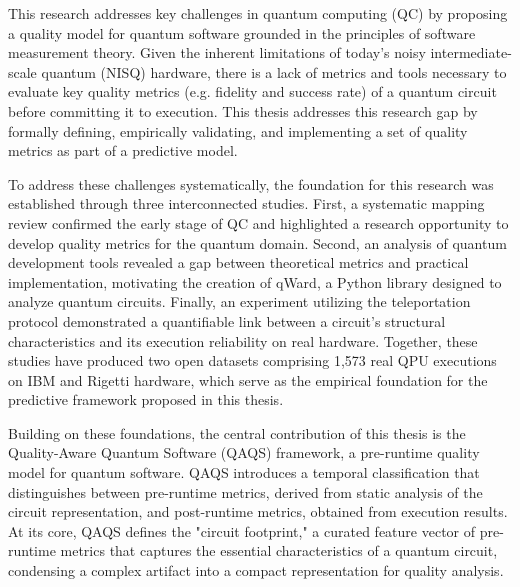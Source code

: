\documentclass{article}
\begin{document}
This research addresses key challenges in quantum computing (QC) by proposing a quality model for quantum software grounded in the principles of software measurement theory. Given the inherent limitations of today's noisy intermediate-scale quantum (NISQ) hardware, there is a lack of metrics and tools necessary to evaluate key quality metrics (e.g. fidelity and success rate) of a quantum circuit before committing it to execution. This thesis addresses this research gap by formally defining, empirically validating, and implementing a set of quality metrics as part of a predictive model.

To address these challenges systematically, the foundation for this research was established through three interconnected studies. First, a systematic mapping review confirmed the early stage of QC and highlighted a research opportunity to develop quality metrics for the quantum domain. Second, an analysis of quantum development tools revealed a gap between theoretical metrics and practical implementation, motivating the creation of qWard, a Python library designed to analyze quantum circuits. Finally, an experiment utilizing the teleportation protocol demonstrated a quantifiable link between a circuit's structural characteristics and its execution reliability on real hardware. Together, these studies have produced two open datasets comprising 1{,}573 real QPU executions on IBM and Rigetti hardware, which serve as the empirical foundation for the predictive framework proposed in this thesis.

Building on these foundations, the central contribution of this thesis is the Quality-Aware Quantum Software (QAQS) framework, a pre-runtime quality model for quantum software. QAQS introduces a temporal classification that distinguishes between pre-runtime metrics, derived from static analysis of the circuit representation, and post-runtime metrics, obtained from execution results. At its core, QAQS defines the "circuit footprint," a curated feature vector of pre-runtime metrics that captures the essential characteristics of a quantum circuit, condensing a complex artifact into a compact representation for quality analysis.
\end{document}
